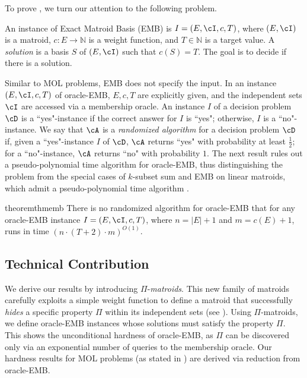 To prove , we turn our attention to the following problem. %
\begin{definition}
	\label{def:EMB}
	An instance of {\sc Exact Matroid Basis (EMB)}  is $I =  (E,\cI,c,T)$, where $(E,\cI)$ is a matroid, $c:E \rightarrow \mathbb{N}$ is a weight function, and $T \in \mathbb{N}$ is a target value. A {\em solution} is a basis $S$ of $(E,\cI)$ such that $c(S)=T$. The goal is to decide if there is a solution. 
\end{definition}
Similar to MOL problems, EMB does not specify the input. 
In an instance $(E,\cI,c,T)$ of {\sc oracle-EMB},
$E,c,T$ are explicitly given, and the independent sets $\cI$ are accessed via a membership oracle. An instance $I$ of a decision problem $\cD$
is a ``yes"-instance if the correct answer for $I$ is ``yes"; otherwise, $I$ is a ``no"-instance.
We say that $\cA$ is a {\em randomized algorithm} for a decision problem $\cD$ if,
 given a ``yes"-instance $I$ of $\cD$, $\cA$ returns ``yes"  with probability at least $\frac{1}{2}$; for a ``no"-instance, $\cA$ returns ``no" with probability $1$. The next result rules out a pseudo-polynomial time algorithm for oracle-EMB, thus distinguishing the problem from the special cases of $k$-{\sc subset sum} and EMB on linear matroids, which admit a pseudo-polynomial  time algorithm \cite{CGM92}. 

\begin{restatable}{theorem}{thmemb}
	\label{thm:emb}
	There is no randomized  algorithm  for {\sc oracle-EMB} that for any  \textnormal{oracle-EMB} instance $I =(E,\cI,c,T)$, where $n = |E|+1$ and  $m = c(E)+1$,  runs in time $ \left(n \cdot(T+2) \cdot m \right)^{O(1)}$. 
\end{restatable}

 

\subsection{Technical Contribution}
We derive our results by introducing $\Pi$-{\em matroids}.
This new family of matroids carefully exploits a simple weight function to define a matroid that successfully {\em hides} a specific property $\Pi$ within its independent sets (see ). Using $\Pi$-matroids, we define %
	oracle-EMB instances whose solutions must satisfy the property $\Pi$. This shows the unconditional hardness of oracle-EMB, as $\Pi$ can be discovered only via an exponential number of queries to the membership oracle. Our hardness results for MOL problems (as stated in ) are derived via reduction from oracle-EMB.
	
